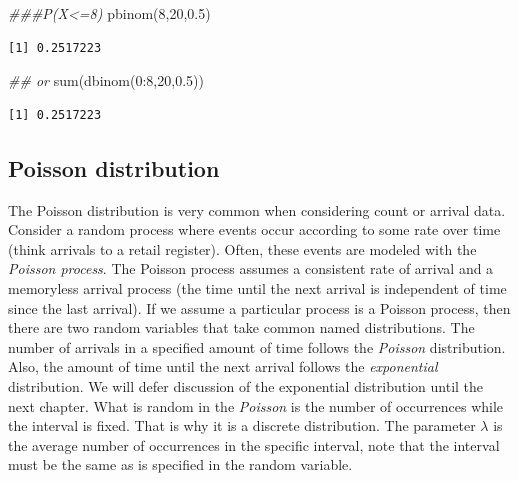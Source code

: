 \documentclass[
  letterpaper,
  DIV=11,
  numbers=noendperiod]{scrreprt}
\newenvironment{Shaded}{\begin{snugshade}}{\end{snugshade}}
\newcommand{\DecValTok}[1]{\textcolor[rgb]{0.68,0.00,0.00}{#1}}
\newcommand{\DocumentationTok}[1]{\textcolor[rgb]{0.37,0.37,0.37}{\textit{#1}}}
\newcommand{\FloatTok}[1]{\textcolor[rgb]{0.68,0.00,0.00}{#1}}
\newcommand{\FunctionTok}[1]{\textcolor[rgb]{0.28,0.35,0.67}{#1}}
\newcommand{\NormalTok}[1]{\textcolor[rgb]{0.00,0.23,0.31}{#1}}
\newcommand{\SpecialCharTok}[1]{\textcolor[rgb]{0.37,0.37,0.37}{#1}}
\begin{document}
\begin{Shaded}
\begin{Highlighting}[]
\DocumentationTok{\#\#\#P(X\textless{}=8)}
\FunctionTok{pbinom}\NormalTok{(}\DecValTok{8}\NormalTok{,}\DecValTok{20}\NormalTok{,}\FloatTok{0.5}\NormalTok{)}
\end{Highlighting}
\end{Shaded}

\begin{verbatim}
[1] 0.2517223
\end{verbatim}

\begin{Shaded}
\begin{Highlighting}[]
\DocumentationTok{\#\# or }
\FunctionTok{sum}\NormalTok{(}\FunctionTok{dbinom}\NormalTok{(}\DecValTok{0}\SpecialCharTok{:}\DecValTok{8}\NormalTok{,}\DecValTok{20}\NormalTok{,}\FloatTok{0.5}\NormalTok{))}
\end{Highlighting}
\end{Shaded}

\begin{verbatim}
[1] 0.2517223
\end{verbatim}

\subsection{Poisson distribution}\label{poisson-distribution}

The Poisson distribution is very common when considering count or
arrival data. Consider a random process where events occur according to
some rate over time (think arrivals to a retail register). Often, these
events are modeled with the \emph{Poisson process}. The Poisson process
assumes a consistent rate of arrival and a memoryless arrival process
(the time until the next arrival is independent of time since the last
arrival). If we assume a particular process is a Poisson process, then
there are two random variables that take common named distributions. The
number of arrivals in a specified amount of time follows the
\emph{Poisson} distribution. Also, the amount of time until the next
arrival follows the \emph{exponential} distribution. We will defer
discussion of the exponential distribution until the next chapter. What
is random in the \emph{Poisson} is the number of occurrences while the
interval is fixed. That is why it is a discrete distribution. The
parameter \(\lambda\) is the average number of occurrences in the
specific interval, note that the interval must be the same as is
specified in the random variable.
\end{document}
